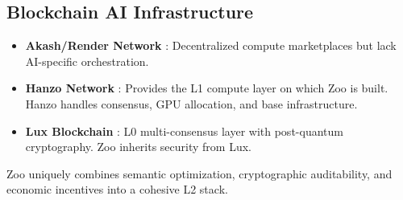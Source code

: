 \subsection{Blockchain AI Infrastructure}

\begin{itemize}[leftmargin=*]
\item \textbf{Akash/Render Network} \cite{akash2021whitepaper}: Decentralized compute marketplaces but lack AI-specific orchestration.
\item \textbf{Hanzo Network} \cite{hanzo2025paper}: Provides the L1 compute layer on which Zoo is built. Hanzo handles consensus, GPU allocation, and base infrastructure.
\item \textbf{Lux Blockchain} \cite{lux2025whitepaper}: L0 multi-consensus layer with post-quantum cryptography. Zoo inherits security from Lux.
\end{itemize}

Zoo uniquely combines semantic optimization, cryptographic auditability, and economic incentives into a cohesive L2 stack.

